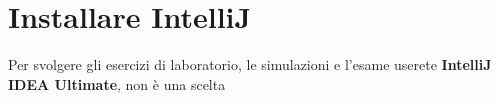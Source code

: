 \section{Installare IntelliJ}
Per svolgere gli esercizi di laboratorio, le simulazioni e l'esame userete \textbf{IntelliJ IDEA Ultimate}, non è una scelta  